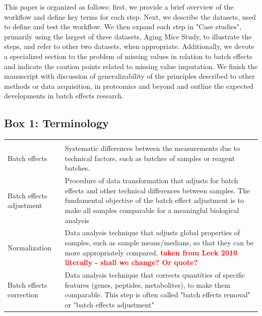 \documentclass[num-refs]{wiley-article}
\begin{document}
This paper is organized as follows: first, we provide a brief overview of the workflow and define key terms for each step.  Next, we describe the datasets, used to define and test the workflow. We then expand each step in "Case studies", primarily using the largest of three datasets, Aging Mice Study, to illustrate the steps, and refer to other two datasets, when appropriate. Additionally, we devote a specialized section to the problem of missing values in relation to batch effects and indicate the caution points related to missing value imputation. We finish the manuscript with discussion of generalizability of the principles described to other methods or data acquisition, in proteomics and beyond and outline the expected developments in batch effects research.

\begin{table}[ht]
\begin{tcolorbox}
	\section*{Box 1: Terminology}
	\label{box:Box1_definitions}
	\begin{tabular}{>{\raggedright}p{2cm}m{10.5cm}}
		\headrow
		\thead{Term} & \thead{Definition} \\
		Batch effects & Systematic differences between the measurements due to technical factors, such as batches of samples or reagent batches.  \\
		Batch effects adjustment & Procedure of data transformation that adjusts for batch effects and other technical differences between samples. The fundamental objective of the batch effect adjustment is to make all samples comparable for a meaningful biological analysis \\
		Normalization & Data analysis technique that adjusts global properties of samples, such as sample means/medians, so that they can be more appropriately compared. \textcolor{red}{\textbf{taken from Leek 2010 literally - shall we change? Or quote?}} \\
		Batch effects correction & Data analysis technique that corrects quantities of specific features (genes, peptides, metabolites), to make them comparable. This step is often called "batch effects removal" or "batch effects adjustment" \\
		\hline  %
	\end{tabular}
	
\end{tcolorbox}
\end{table}
\end{document}
